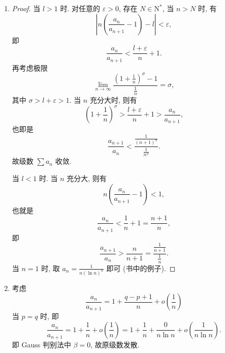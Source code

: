 \begin{enumerate}
\begin{proof}
\[            \]
            也就是
            \[
                \frac{(q - \varepsilon)^n}{(q - \varepsilon)^N}a_N < a_n,    
            \]
            两边同时开 $n$ 次方, 再取下极限, 则有
            \[
                \liminf_{n\to\infty}\sqrt[n]{a_n} \geq q - \varepsilon.
            \]
            再令 $\varepsilon \to 0$, 即可得
            \[
                \liminf_{n\to\infty}\sqrt[n]{a_n} \geq \liminf_{n\to\infty}\frac{a_{n+1}}{a_n}. \qedhere    
            \]
        \end{proof}
    \item %
        \begin{proof}
            当 $l > 1$ 时. 对任意的 $\varepsilon > 0$, 存在 $N \in \mathrm{N}^*$, 当 $n > N$ 时, 有
            \[
                \left|n\left(\frac{a_n}{a_{n+1}} - 1\right) - l\right| < \varepsilon,    
            \]
            即
            \[
                \frac{a_n}{a_{n+1}} < \frac{l + \varepsilon}{n} + 1.   
            \]
            再考虑极限
            \[
                \lim_{n\to\infty}\frac{\left(1 + \frac1n\right)^\sigma - 1}{\frac1n} = \sigma,    
            \]
            其中 $\sigma > l + \varepsilon > 1$. 当 $n$ 充分大时, 则有
            \[
                \left(1 + \frac1n\right)^\sigma > \frac{l + \varepsilon}{n} + 1 > \frac{a_n}{a_{n+1}},    
            \]
            也即是
            \[
                \frac{a_{n+1}}{a_n} < \frac{\frac{1}{(n+1)^\sigma}}{\frac{1}{n^\sigma}}.    
            \]
            故级数 $\sum a_n$ 收敛.

            当 $l < 1$ 时. 当 $n$ 充分大, 则有
            \[
                n\left(\frac{a_n}{a_{n+1}} - 1\right) < 1,    
            \]
            也就是
            \[
                \frac{a_n}{a_{n+1}} < \frac{1}{n} + 1 = \frac{n+1}{n},    
            \]
            即
            \[
                \frac{a_{n+1}}{a_n} > \frac{n}{n+1} = \frac{\frac{1}{n+1}}{\frac{1}{n}}.    
            \]
            当 $n = 1$ 时, 取 $a_n = \frac{1}{n(\ln n)^\alpha}$ 即可 (书中的例子).
        \end{proof}
    \item %
        考虑
        \[
            \frac{a_n}{a_{n+1}} = 1 + \frac{q - p + 1}{n} + o\left(\frac1n\right)    
        \]
        当 $p = q$ 时, 即
        \[
            \frac{a_n}{a_{n+1}} = 1 + \frac1n + o\left(\frac1n\right) = 1 + \frac1n + \frac{0}{n\ln{n}} + o\left(\frac{1}{n\ln{n}}\right).    
        \]
        即 Gauss 判别法中 $\beta = 0$, 故原级数发散.
\end{enumerate}
% 
